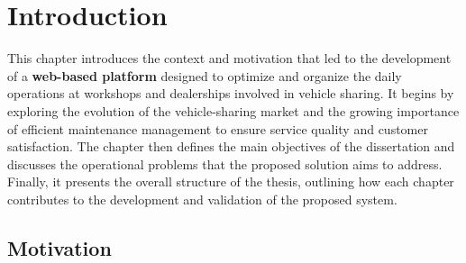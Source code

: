 \chapter{Introduction}%
\label{chapter:introduction}

\begin{introduction}


This chapter introduces the context and motivation that led to the development of a \textbf{web-based platform} designed to optimize and organize the daily operations at workshops and dealerships involved in vehicle sharing. It begins by exploring the evolution of the vehicle-sharing market and the growing importance of efficient maintenance management to ensure service quality and customer satisfaction. The chapter then defines the main objectives of the dissertation and discusses the operational problems that the proposed solution aims to address. Finally, it presents the overall structure of the thesis, outlining how each chapter contributes to the development and validation of the proposed system.

\end{introduction} 


\section{Motivation}

